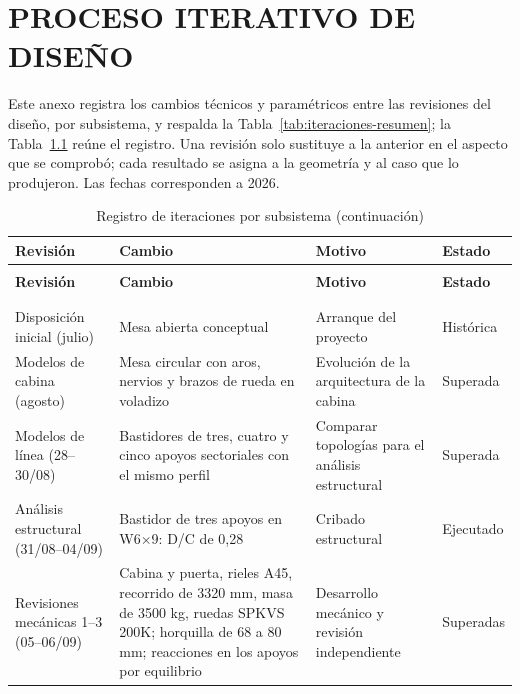 \chapter{PROCESO ITERATIVO DE DISEÑO}
\label{anx:iteraciones}

Este anexo registra los cambios técnicos y paramétricos entre las revisiones del diseño, por subsistema, y respalda la Tabla~\ref{tab:iteraciones-resumen}; la Tabla~\ref{tab:anx-iteraciones} reúne el registro. Una revisión solo sustituye a la anterior en el aspecto que se comprobó; cada resultado se asigna a la geometría y al caso que lo produjeron. Las fechas corresponden a 2026.

\begingroup
\small\singlespacing
\setlength{\tabcolsep}{4pt}
\begin{longtable}{@{}>{\raggedright\arraybackslash}p{2.6cm}>{\raggedright\arraybackslash}p{}>{\raggedright\arraybackslash}p{}>{\raggedright\arraybackslash}p{2.4cm}@{}}
\caption{Registro de iteraciones por subsistema}\label{tab:anx-iteraciones}\\
\toprule
\textbf{Revisión} & \textbf{Cambio} & \textbf{Motivo} & \textbf{Estado}\\
\midrule\endfirsthead
\caption[]{Registro de iteraciones por subsistema (continuación)}\\
\toprule
\textbf{Revisión} & \textbf{Cambio} & \textbf{Motivo} & \textbf{Estado}\\
\midrule\endhead
\midrule\multicolumn{4}{r}{\textit{Continúa en la página siguiente.}}\\\endfoot
\bottomrule\endlastfoot
\multicolumn{4}{@{}l}{\textit{Estructura y mesa}}\\
Disposición inicial (julio) & Mesa abierta conceptual & Arranque del proyecto & Histórica\\
Modelos de cabina (agosto) & Mesa circular con aros, nervios y brazos de rueda en voladizo & Evolución de la arquitectura de la cabina & Superada\\
Modelos de línea (28--30/08) & Bastidores de tres, cuatro y cinco apoyos sectoriales con el mismo perfil & Comparar topologías para el análisis estructural & Superada\\
Análisis estructural (31/08--04/09) & Bastidor de tres apoyos en W6$\times$9: D/C de 0,28 & Cribado estructural & Ejecutado\\
Revisiones mecánicas 1--3 (05--06/09) & Cabina y puerta, rieles A45, recorrido de 3320 mm, masa de 3500 kg, ruedas SPKVS 200K; horquilla de 68 a 80 mm; reacciones en los apoyos por equilibrio & Desarrollo mecánico y revisión independiente & Superadas\\

\end{longtable}
